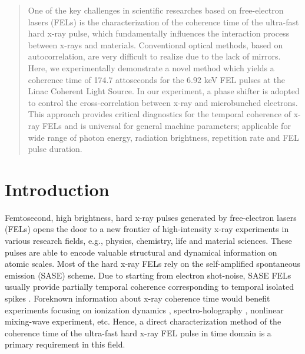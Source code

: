 \documentclass[%
 preprint,
 amsmath,amssymb,
 aps,
 prl,
 superscriptaddress,
 floatfix,
 letter,
]{revtex4-1}
\begin{document}
\author{Moohyun Yoon}

\author{Juhao Wu}

\date{\today}

\begin{abstract}

One of the key challenges in scientific researches based on free-electron lasers (FELs) is the characterization of the coherence time of the ultra-fast hard x-ray pulse, which fundamentally influences the interaction process between x-rays and materials. Conventional optical methods, based on autocorrelation, are very difficult to realize due to the lack of mirrors. Here, we experimentally demonstrate a novel method which yields a coherence time of 174.7 attoseconds for the 6.92 keV FEL pulses at the Linac Coherent Light Source. In our experiment, a phase shifter is adopted to control the cross-correlation between x-ray and microbunched electrons. This approach provides critical diagnostics for the temporal coherence of x-ray FELs and is universal for general machine parameters; applicable for wide range of photon energy, radiation brightness, repetition rate and FEL pulse duration.


\end{abstract}
\maketitle


\section{Introduction}
Femtosecond, high brightness, hard x-ray pulses generated by free-electron lasers (FELs)\cite*{LCLS_firstlasering,SACLA,PAL,EXFELNIM,swiss} opens the door to a new frontier of high-intensity x-ray experiments in various research fields, e.g., physics, chemistry\cite{Zhang2014}, life\cite{Seibert2011} and material sciences\cite{Milathianaki220}. These pulses are able to encode valuable structural and dynamical information on atomic scales. Most of the hard x-ray FELs rely on the self-amplified spontaneous emission (SASE) scheme. Due to starting from electron shot-noise, SASE FELs usually provide partially temporal coherence corresponding to temporal isolated spikes \cite{Hartmann2018}. Foreknown information about x-ray coherence time would benefit experiments focusing on ionization dynamics \cite{Young2010}, spectro-holography \cite{spectro-holography}, nonlinear mixing-wave experiment\cite{Mixing}, etc. Hence, a direct characterization method of the coherence time of the ultra-fast hard x-ray FEL pulse in time domain is a primary requirement in this field.
\end{document}
